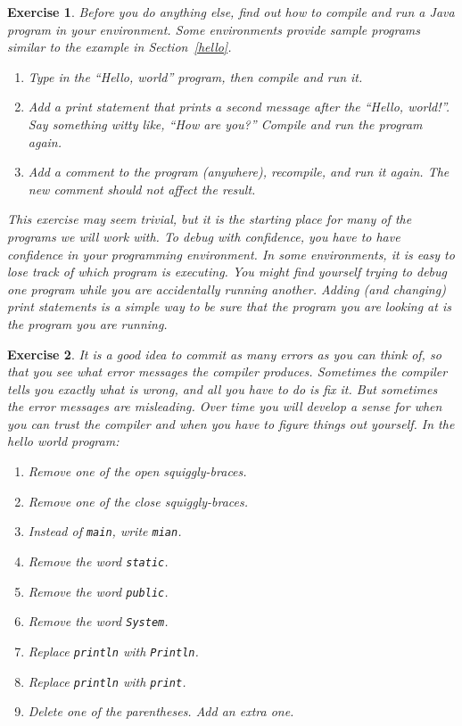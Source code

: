 \documentclass[12pt]{book}
\theoremstyle{exercise}
\newtheorem{exercise}{Exercise}[chapter]
\newcommand{\java}[1]{\verb"#1"}
\newcommand{\java}[1]{\lstinline{#1}} %
\begin{document}
\begin{exercise}

Before you do anything else, find out how to compile and run a Java program in your environment.
Some environments provide sample programs similar to the example in Section~\ref{hello}.

\begin{enumerate}
\item Type in the ``Hello, world'' program, then compile and run it.

\item Add a print statement that prints a second message after the ``Hello, world!''.
Say something witty like, ``How are you?''
Compile and run the program again.

\item Add a comment to the program (anywhere), recompile, and run it again.
The new comment should not affect the result.
\end{enumerate}

This exercise may seem trivial, but it is the starting place for many of the programs we will work with.
To debug with confidence, you have to have confidence in your programming environment.
In some environments, it is easy to lose track of which program is executing.
You might find yourself trying to debug one program while you are accidentally running another.
Adding (and changing) print statements is a simple way to be sure that the program you are looking at is the program you are running.

\end{exercise}


\begin{exercise}

It is a good idea to commit as many errors as you can think of, so that you see what error messages the compiler produces.
Sometimes the compiler tells you exactly what is wrong, and all you have to do is fix it.
But sometimes the error messages are misleading.
Over time you will develop a sense for when you can trust the compiler and when you have to figure things out yourself.
In the hello world program:

\begin{enumerate}
\item Remove one of the open squiggly-braces.
\item Remove one of the close squiggly-braces.
\item Instead of \java{main}, write \java{mian}.
\item Remove the word \java{static}.
\item Remove the word \java{public}.
\item Remove the word \java{System}.
\item Replace \java{println} with \java{Println}.
\item Replace \java{println} with \java{print}.
\item Delete one of the parentheses.
Add an extra one.
\end{enumerate}


\end{exercise}
\end{document}

